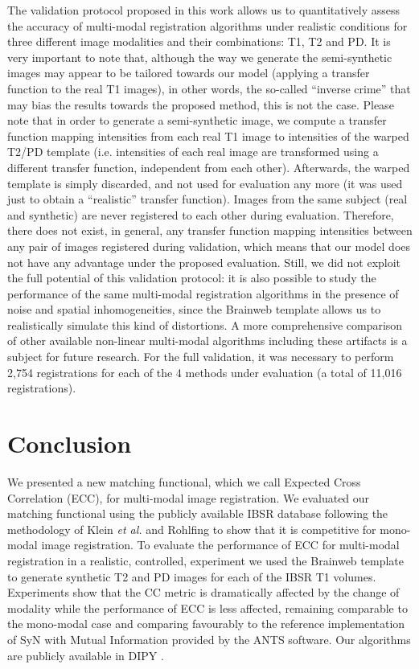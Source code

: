 The validation protocol proposed in this work allows us to quantitatively assess the accuracy of multi-modal registration algorithms under realistic conditions for three different image modalities and their combinations: T1, T2 and PD. It is very important to note that, although the way we generate the semi-synthetic images may appear to be tailored towards our model (applying a transfer function to the real T1 images), in other words, the so-called ``inverse crime'' that may bias the results towards the proposed method, this is not the case. Please note that in order to generate a semi-synthetic image, we compute a transfer function mapping intensities from each real T1 image to intensities of the warped T2/PD template (i.e. intensities of each real image are transformed using a different transfer function, independent from each other). Afterwards, the warped template is simply discarded, and not used for evaluation any more (it was used just to obtain a ``realistic'' transfer function). Images from the same subject (real and synthetic) are never registered to each other during evaluation. Therefore, there does not exist, in general, any transfer function mapping intensities between any pair of images registered during validation, which means that our model does not have any advantage under the proposed evaluation. Still, we did not exploit the full potential of this validation protocol: it is also possible to study the performance of the same multi-modal registration algorithms in the presence of noise and spatial inhomogeneities, since the Brainweb template allows us to realistically simulate this kind of distortions. A more comprehensive comparison of other available non-linear multi-modal algorithms including these artifacts is a subject for future research. For the full validation, it was necessary to perform 2,754 registrations for each of the 4 methods under evaluation (a total of 11,016 registrations).

\section{Conclusion}
We presented a new matching functional, which we call Expected Cross Correlation (ECC), for multi-modal image registration. We evaluated our matching functional using the publicly available IBSR database following the methodology of Klein {\it et al.}\cite{Klein2009, Klein2010} and Rohlfing \cite{Rohlfing2012} to show that it is competitive for mono-modal image registration. To evaluate the performance of ECC for multi-modal registration in a realistic, controlled, experiment we used the Brainweb \citep{Cocosco1997, Kwan1999} template to generate synthetic T2 and PD images for each of the IBSR T1 volumes. Experiments show that the CC metric is dramatically affected by the change of modality while the performance of ECC is less affected, remaining comparable to the mono-modal case and comparing favourably to the reference implementation of SyN with Mutual Information provided by the ANTS software. Our algorithms are publicly available in DIPY \citep{Garyfallidis2014}.\\
